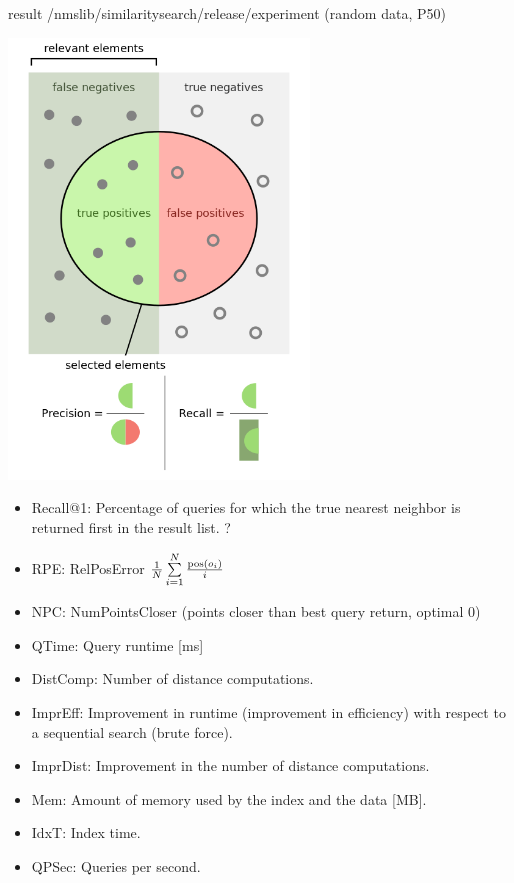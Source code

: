 \documentclass[xcolor=dvipsnames, aspectratio=1610]{beamer}
\begin{document}
\begin{frame}[fragile]{result /nmslib/similarity\textunderscore search/release/experiment (random data, P50)}
{\begin{minipage}{0.99\textwidth}
{}
\end{minipage}
\fboxsep=15pt 
\begin{minipage}{0.45\textwidth} 
\includegraphics[width=0.6\textwidth]{Figures/Precisionrecall.png}
\end{minipage}  
\begin{minipage}{0.45\textwidth} 
\begin{itemize}
\item Recall@1: Percentage of queries for which the true nearest neighbor is returned first in the result list. ?
\item RPE: RelPosError $\frac{1}{N} \sum\limits^N_{i=1} \frac{{\rm pos} \left( o_i \right)}{i}  $ 
\item NPC: NumPointsCloser (points closer than best query return, optimal 0)
\item QTime: Query runtime [ms] 
\item DistComp: Number of distance computations.
\item ImprEff:  Improvement in runtime (improvement in efficiency) with respect to a sequential search (brute force).
\item ImprDist:  Improvement in the number of distance computations.
\item Mem:  Amount of memory used by the index and the data [MB].
\item IdxT: Index time. 
\item QPSec: Queries per second.
\end{itemize}
\end{minipage} }
\end{frame}
\end{document}
